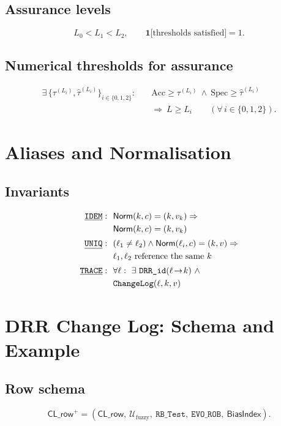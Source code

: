\documentclass[conference]{IEEEtran}
\begin{document}
\subsection{Assurance levels}
\begin{equation}
\label{eq:assurance-levels}
L_0<L_1<L_2,\qquad \mathbf{1}\big[\text{thresholds satisfied}\big]=1.
\end{equation}

\subsection{Numerical thresholds for assurance}
\begin{equation}
\label{eq:assurance-thr}
\begin{aligned}
\exists\,\{\tau^{(L_i)},\hat{\tau}^{(L_i)}\}_{i\in\{0,1,2\}}:\quad
& \mathrm{Acc}\ge\tau^{(L_i)}\ \wedge\ \mathrm{Spec}\ge\hat{\tau}^{(L_i)}\\
& \Rightarrow\ L\ge L_i\qquad(\forall\, i\in\{0,1,2\}).
\end{aligned}
\end{equation}

\section{Aliases and Normalisation}
\subsection{Invariants}
\begin{align}
\underline{\mathtt{IDEM}}:\ &\ \mathsf{Norm}(k,c)=(k,v_k)\Rightarrow \label{eq:idem}\\
&\ \mathsf{Norm}(k,c)=(k,v_k) \notag\\[2pt]
\underline{\mathtt{UNIQ}}:\ &\ (\ell_1\neq \ell_2)\wedge \mathsf{Norm}(\ell_i,c)=(k,v)\Rightarrow \label{eq:uniq}\\
&\ \ell_1,\ell_2\ \text{reference the same }k \notag\\[2pt]
\underline{\mathtt{TRACE}}:\ &\ \forall \ell:\ \exists\ \texttt{DRR\_id}(\ell\!\to\! k)\ \wedge \label{eq:trace}\\
&\ \texttt{ChangeLog}(\ell,k,v) \notag
\end{align}

\section{DRR Change Log: Schema and Example}
\subsection{Row schema}
\begin{equation}
\label{eq:chlog-row}
\mathsf{CL\_row}^{+}=(\mathsf{CL\_row},\ \mathcal{U}_{\mathrm{fuzzy}},\ \mathtt{RB\_Test},\ \mathtt{EVO\_ROB},\ \mathsf{BiasIndex}).
\end{equation}
\end{document}
